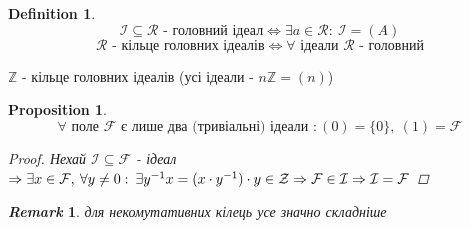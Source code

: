 \documentclass[a4paper,12pt, centered]{bookest}
\newtheorem{definition}{Definition}[section]
\newtheorem*{prop*}{Proposition}
\newtheorem*{remark*}{\emph{Remark}}
\begin{document}
\begin{definition}
	$$\mathcal{I}\subseteq\mathcal{R}\textrm{ - головний ідеал}\Leftrightarrow\exists a\in\mathcal{R}:\>\mathcal{I}=(A)$$
	$$\mathcal{R}\textrm{ - кільце головних ідеалів}\Leftrightarrow\forall\textrm{ ідеали }\mathcal{R}\textrm{ - головний}$$
\end{definition}
\begin{example}
	$\mathbb{Z}$ - кільце головних ідеалів (усі ідеали - $n\mathbb{Z}=(n)$)
\end{example}
\begin{prop*}
	$$\forall\textrm{ поле }\mathcal{F}\textrm{ є лише два (тривіальні) ідеали }:(0)=\{0\},\>(1)=\mathcal{F}$$
	\begin{proof}
		Нехай $\mathcal{I}\subseteq\mathcal{F}$ - ідеал $\Rightarrow\exists x\in\mathcal{F},\>\forall y\neq0:\>\exists y^{-1}\\x=(x\cdot y^{-1})\cdot y\in\mathcal{Z}\Rightarrow\mathcal{F}\in\mathcal{I}\Rightarrow\mathcal{I}=\mathcal{F}$
	\end{proof}
\end{prop*}
\begin{remark*}
	для некомутативних кілець усе значно складніше 
\end{remark*}
\end{document}
